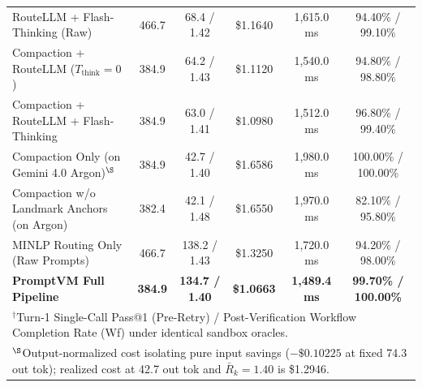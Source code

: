 \documentclass[conference,10pt]{IEEEtran}
\begin{document}
\begin{table}[b]
{\begin{tabular}{lccccc}
RouteLLM + Flash-Thinking (Raw) \cite{ong2025routellm} & 466.7 & 68.4 / 1.42 & \$1.1640 & 1,615.0 ms & 94.40\% / 99.10\% \\
Compaction + RouteLLM ($T_{\text{think}}=0$) \cite{ong2025routellm} & 384.9 & 64.2 / 1.43 & \$1.1120 & 1,540.0 ms & 94.80\% / 98.80\% \\
Compaction + RouteLLM + Flash-Thinking \cite{ong2025routellm} & 384.9 & 63.0 / 1.41 & \$1.0980 & 1,512.0 ms & 96.80\% / 99.40\% \\
Compaction Only (on Gemini 4.0 Argon)$^\S$ & 384.9 & 42.7 / 1.40 & \$1.6586 & 1,980.0 ms & 100.00\% / 100.00\% \\
Compaction w/o Landmark Anchors (on Argon) & 382.4 & 42.1 / 1.48 & \$1.6550 & 1,970.0 ms & 82.10\% / 95.80\% \\
MINLP Routing Only (Raw Prompts) & 466.7 & 138.2 / 1.43 & \$1.3250 & 1,720.0 ms & 94.20\% / 98.00\% \\
\textbf{PromptVM Full Pipeline} & \textbf{384.9} & \textbf{134.7 / 1.40} & \textbf{\$1.0663} & \textbf{1,489.4 ms} & \textbf{99.70\% / 100.00\%} \\
\bottomrule
\multicolumn{6}{l}{\scriptsize $^\dagger$Turn-1 Single-Call Pass@1 (Pre-Retry) / Post-Verification Workflow Completion Rate (Wf) under identical sandbox oracles.} \\
\multicolumn{6}{l}{\scriptsize $^\S$Output-normalized cost isolating pure input savings ($-\$0.10225$ at fixed 74.3 out tok); realized cost at 42.7 out tok and $\bar{R}_k=1.40$ is \$1.2946.}
\end{tabular}%
}
\end{table}
\end{document}
